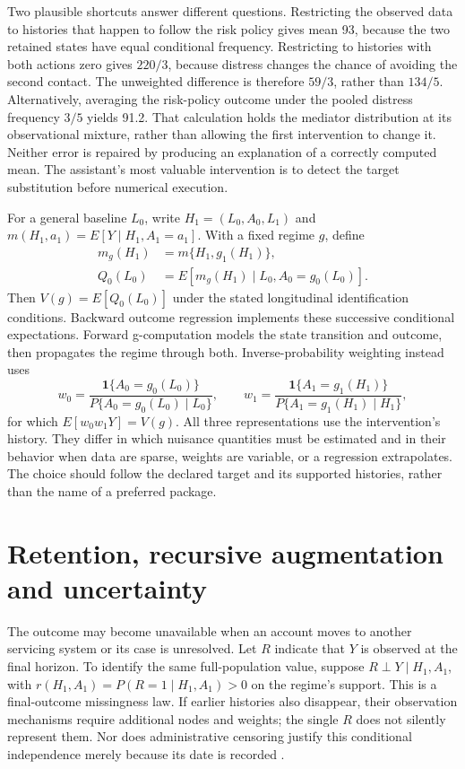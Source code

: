 Two plausible shortcuts answer different questions. Restricting the observed
data to histories that happen to follow the risk policy gives mean 93, because
the two retained states have equal conditional frequency. Restricting to
histories with both actions zero gives $220/3$, because distress changes the
chance of avoiding the second contact. The unweighted difference is therefore
$59/3$, rather than $134/5$. Alternatively, averaging the risk-policy outcome
under the pooled distress frequency $3/5$ yields 91.2. That calculation holds
the mediator distribution at its observational mixture, rather than allowing
the first intervention to change it. Neither error is repaired by producing
an explanation of a correctly computed mean. The assistant's most valuable
intervention is to detect the target substitution before numerical execution.

For a general baseline $L_0$, write
$H_1=(L_0,A_0,L_1)$ and
$m(H_1,a_1)=E[Y\mid H_1,A_1=a_1]$. With a fixed regime $g$, define
\begin{align*}
 m_g(H_1)&=m\{H_1,g_1(H_1)\},\\
 Q_0(L_0)&=E[m_g(H_1)\mid L_0,A_0=g_0(L_0)].
\end{align*}
Then $V(g)=E[Q_0(L_0)]$ under the stated longitudinal identification
conditions. Backward outcome regression implements these successive
conditional expectations. Forward g-computation models the state transition
and outcome, then propagates the regime through both. Inverse-probability
weighting instead uses
\[
 w_0=\frac{\mathbf1\{A_0=g_0(L_0)\}}
 {P\{A_0=g_0(L_0)\mid L_0\}},\qquad
 w_1=\frac{\mathbf1\{A_1=g_1(H_1)\}}
 {P\{A_1=g_1(H_1)\mid H_1\}},
\]
for which $E[w_0w_1Y]=V(g)$. All three representations use the intervention's
history. They differ in which nuisance quantities must be estimated and in
their behavior when data are sparse, weights are variable, or a regression
extrapolates. The choice should follow the declared target and its supported
histories, rather than the name of a preferred package.

\section{Retention, recursive augmentation and uncertainty}
\label{exec14:l5-retention}

The outcome may become unavailable when an account moves to another servicing
system or its case is unresolved. Let $R$ indicate that $Y$ is observed at the
final horizon. To identify the same full-population value, suppose
$R\perp Y\mid H_1,A_1$, with
$r(H_1,A_1)=P(R=1\mid H_1,A_1)>0$ on the regime's support. This is a final-outcome
missingness law. If earlier histories also disappear, their observation
mechanisms require additional nodes and weights; the single $R$ does not
silently represent them. Nor does administrative censoring justify this
conditional independence merely because its date is recorded
\citep{hernan2020}.

